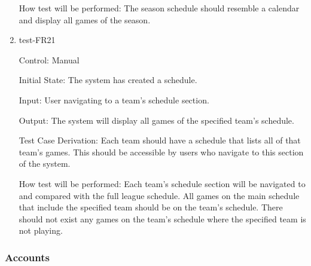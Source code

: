 \documentclass[12pt, titlepage]{article}
\begin{document}
\begin{enumerate}
  How test will be performed: The season schedule should resemble a calendar and display all games of the season.

  \item{test-FR21\\}

  Control: Manual

  Initial State: The system has created a schedule.

  Input: User navigating to a team's schedule section.

  Output: The system will display all games of the specified team's schedule.

  Test Case Derivation: Each team should have a schedule that lists all of
  that team's games. This should be accessible by users who navigate to this
  section of the system.

  How test will be performed: Each team's schedule section will be navigated to
  and compared with the full league schedule. All games on the main schedule
  that include the specified team should be on the team's schedule. There should
  not exist any games on the team's schedule where the specified team is not
  playing.








\end{enumerate}

\subsubsection{Accounts}
\end{document}
